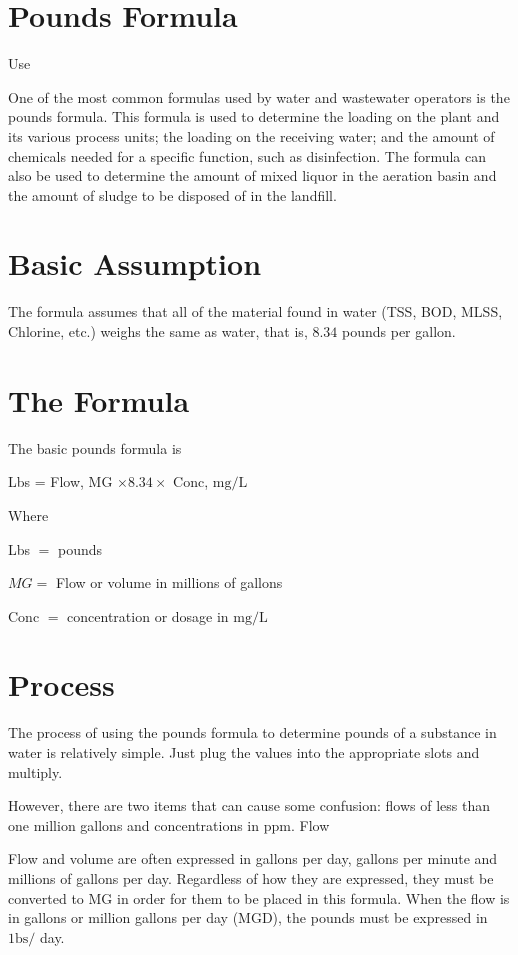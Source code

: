 \section{Pounds Formula}
Use

One of the most common formulas used by water and wastewater operators is the pounds formula. This formula is used to determine the loading on the plant and its various process units; the loading on the receiving water; and the amount of chemicals needed for a specific function, such as disinfection. The formula can also be used to determine the amount of mixed liquor in the aeration basin and the amount of sludge to be disposed of in the landfill.

\section{Basic Assumption}
The formula assumes that all of the material found in water (TSS, BOD, MLSS, Chlorine, etc.) weighs the same as water, that is, $8.34$ pounds per gallon.

\section{The Formula}
The basic pounds formula is

Lbs = Flow, MG $\times 8.34 \times$ Conc, $\mathrm{mg} / \mathrm{L}$

Where

Lbs $=$ pounds

$M G=$ Flow or volume in millions of gallons

Conc $=$ concentration or dosage in $\mathrm{mg} / \mathrm{L}$

\section{Process}
The process of using the pounds formula to determine pounds of a substance in water is relatively simple. Just plug the values into the appropriate slots and multiply.

However, there are two items that can cause some confusion: flows of less than one million gallons and concentrations in ppm. Flow

Flow and volume are often expressed in gallons per day, gallons per minute and millions of gallons per day. Regardless of how they are expressed, they must be converted to MG in order for them to be placed in this formula. When the flow is in gallons or million gallons per day (MGD), the pounds must be expressed in $1 \mathrm{bs} /$ day.

